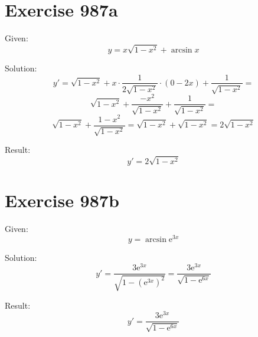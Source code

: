 \documentclass[a4paper, 10pt]{scrartcl}
\newcommand*\euler{\mathrm{e}}
\begin{document}
\section{Exercise 987a}

Given:
\[
y = x\sqrt{1 - x^{2}} + \arcsin{x}
\]

Solution:
\[
y' = \sqrt{1 - x^{2}} + x\cdot\frac{1}{2\sqrt{1 - x^{2}}}\cdot(0 - 2x) + \frac{1}{\sqrt{1 - x^{2}}} =
\]
\[
\sqrt{1 - x^{2}} + \frac{-x^{2}}{\sqrt{1 - x^{2}}} + \frac{1}{\sqrt{1 - x^{2}}} =
\]
\[
\sqrt{1 - x^{2}} + \frac{1 -x^{2}}{\sqrt{1 - x^{2}}} = \sqrt{1 - x^{2}} + \sqrt{1 - x^{2}} = 2\sqrt{1 - x^{2}}
\]

Result:
\[
y' = 2\sqrt{1 - x^{2}}
\]

\section{Exercise 987b}

Given:
\[
y = \arcsin{\euler^{3x}}
\]

Solution:
\[
y' = \frac{3\euler^{3x}}{\sqrt{1 - (\euler^{3x})^{2}}} = \frac{3\euler^{3x}}{\sqrt{1 - \euler^{6x}}}
\]

Result:
\[
y' = \frac{3\euler^{3x}}{\sqrt{1 - \euler^{6x}}}
\]
\end{document}
